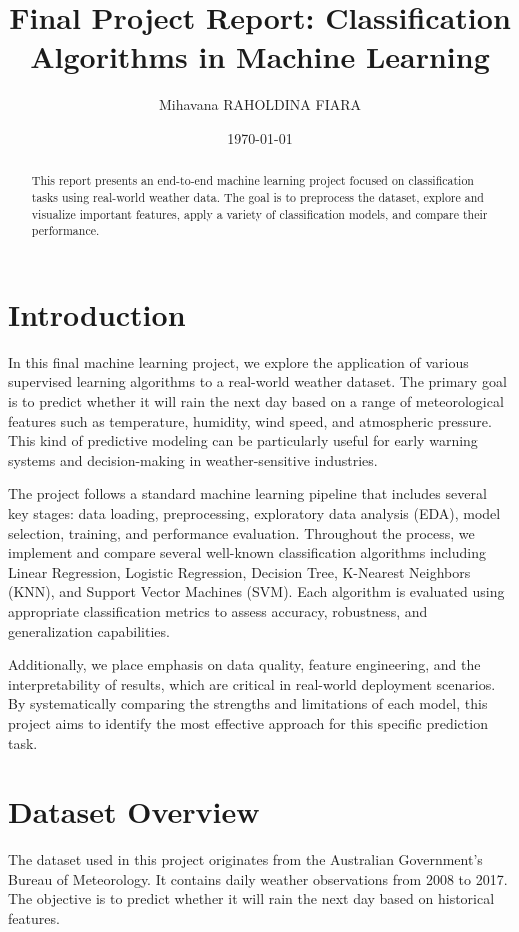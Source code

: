 \documentclass[12pt]{article}
\title{Final Project Report: Classification Algorithms in Machine Learning}
\author{Mihavana RAHOLDINA FIARA}
\date{\today}
\begin{document}
\maketitle

\begin{abstract}
This report presents an end-to-end machine learning project focused on classification tasks using real-world weather data. The goal is to preprocess the dataset, explore and visualize important features, apply a variety of classification models, and compare their performance.
\end{abstract}
\newpage

\tableofcontents
\newpage

\section{Introduction}

\hspace*{1cm}In this final machine learning project, we explore the application of various supervised learning algorithms to a real-world weather dataset. The primary goal is to predict whether it will rain the next day based on a range of meteorological features such as temperature, humidity, wind speed, and atmospheric pressure. This kind of predictive modeling can be particularly useful for early warning systems and decision-making in weather-sensitive industries.

The project follows a standard machine learning pipeline that includes several key stages: data loading, preprocessing, exploratory data analysis (EDA), model selection, training, and performance evaluation. Throughout the process, we implement and compare several well-known classification algorithms including Linear Regression, Logistic Regression, Decision Tree, K-Nearest Neighbors (KNN), and Support Vector Machines (SVM). Each algorithm is evaluated using appropriate classification metrics to assess accuracy, robustness, and generalization capabilities.

Additionally, we place emphasis on data quality, feature engineering, and the interpretability of results, which are critical in real-world deployment scenarios. By systematically comparing the strengths and limitations of each model, this project aims to identify the most effective approach for this specific prediction task.
\newpage

\section{Dataset Overview}
The dataset used in this project originates from the Australian Government's Bureau of Meteorology. It contains daily weather observations from 2008 to 2017. The objective is to predict whether it will rain the next day based on historical features.
\end{document}
